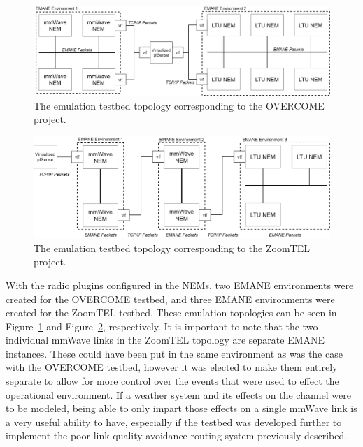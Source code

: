 \begin{figure}[!ht]
    \centering
    \includegraphics[width=\textwidth,keepaspectratio]{Images/Chpt3/EMANE_OVERCOME.png}
    \caption{The emulation testbed topology corresponding to the OVERCOME project.}
    \label{overcome_emane}
\end{figure}
\begin{figure}[!ht]
    \centering
    \includegraphics[width=\textwidth,keepaspectratio]{Images/Chpt3/EMANE_ZoomTEL.png}
    \caption{The emulation testbed topology corresponding to the ZoomTEL project.}
    \label{zoomtel_emane}
\end{figure}
With the radio plugins configured in the NEMs, two EMANE environments were created for the OVERCOME testbed, and three EMANE environments were created for the ZoomTEL testbed.
These emulation topologies can be seen in Figure~\ref{overcome_emane} and Figure~\ref{zoomtel_emane}, respectively.
It is important to note that the two individual mmWave links in the ZoomTEL topology are separate EMANE instances.
These could have been put in the same environment as was the case with the OVERCOME testbed, however it was elected to make them entirely separate to allow for more control over the events that were used to effect the operational environment.
If a weather system and its effects on the channel were to be modeled, being able to only impart those effects on a single mmWave link is a very useful ability to have, especially if the testbed was developed further to implement the poor link quality avoidance routing system previously described.\par
